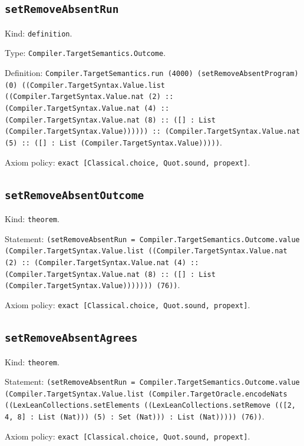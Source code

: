 \documentclass[11pt]{article}
\begin{document}
\subsection*{\texttt{setRemoveAbsentRun}}
\noindent Kind: \texttt{definition}.\par
\noindent Type: \texttt{Compiler.TargetSemantics.Outcome}.\par
\noindent Definition: \texttt{Compiler.TargetSemantics.run (4000) (setRemoveAbsentProgram) (0) ((Compiler.TargetSyntax.Value.list ((Compiler.TargetSyntax.Value.nat (2) :: (Compiler.TargetSyntax.Value.nat (4) :: (Compiler.TargetSyntax.Value.nat (8) :: ([] : List (Compiler.TargetSyntax.Value)))))) :: (Compiler.TargetSyntax.Value.nat (5) :: ([] : List (Compiler.TargetSyntax.Value)))))}.\par
\noindent Axiom policy: \texttt{exact [Classical.choice, Quot.sound, propext]}.\par
\subsection*{\texttt{setRemoveAbsentOutcome}}
\noindent Kind: \texttt{theorem}.\par
\noindent Statement: \texttt{(setRemoveAbsentRun = Compiler.TargetSemantics.Outcome.value (Compiler.TargetSyntax.Value.list ((Compiler.TargetSyntax.Value.nat (2) :: (Compiler.TargetSyntax.Value.nat (4) :: (Compiler.TargetSyntax.Value.nat (8) :: ([] : List (Compiler.TargetSyntax.Value))))))) (76))}.\par
\noindent Axiom policy: \texttt{exact [Classical.choice, Quot.sound, propext]}.\par
\subsection*{\texttt{setRemoveAbsentAgrees}}
\noindent Kind: \texttt{theorem}.\par
\noindent Statement: \texttt{(setRemoveAbsentRun = Compiler.TargetSemantics.Outcome.value (Compiler.TargetSyntax.Value.list (Compiler.TargetOracle.encodeNats ((LexLeanCollections.setElements ((LexLeanCollections.setRemove (([2, 4, 8] : List (Nat))) (5) : Set (Nat))) : List (Nat))))) (76))}.\par
\noindent Axiom policy: \texttt{exact [Classical.choice, Quot.sound, propext]}.\par
\end{document}
